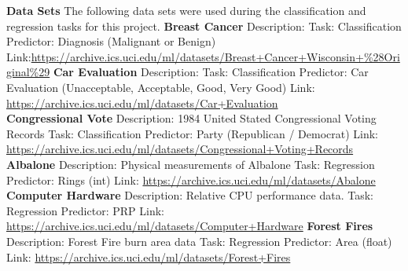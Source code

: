 \documentclass[twoside,11pt]{article}
\begin{document}
{\noindent}{\bf Data Sets}\newline
The following data sets were used during the classification and regression tasks for this project.\newline
{\bf Breast Cancer}\newline
Description: \newline
Task: Classification\newline
Predictor: Diagnosis (Malignant or Benign)\newline
Link:\newline \url{https://archive.ics.uci.edu/ml/datasets/Breast+Cancer+Wisconsin+%28Original%29}\newline
{\noindent}\textbf{Car Evaluation}\newline
Description:\newline
Task: Classification\newline
Predictor: Car Evaluation (Unacceptable, Acceptable, Good, Very Good)\newline
Link: \newline
\url{https://archive.ics.uci.edu/ml/datasets/Car+Evaluation}\\
{\noindent}\textbf{Congressional Vote}\newline
Description: 1984 United Stated Congressional Voting Records\newline
Task: Classification \newline
Predictor: Party (Republican / Democrat) \newline
Link: \newline
\url{https://archive.ics.uci.edu/ml/datasets/Congressional+Voting+Records}\newline
{\noindent}\textbf{Albalone}\newline
Description: Physical measurements of Albalone\newline
Task: Regression\newline
Predictor: Rings (int)\newline
Link: \newline
\url{https://archive.ics.uci.edu/ml/datasets/Abalone}\newline
{\noindent}\textbf{Computer Hardware}\newline
Description: Relative CPU performance data.\newline
Task: Regression\newline
Predictor: PRP\newline
Link: \newline
\url{https://archive.ics.uci.edu/ml/datasets/Computer+Hardware}\newline
{\noindent}\textbf{Forest Fires}\newline
Description: Forest Fire burn area data\newline
Task: Regression\newline
Predictor: Area (float)\newline
Link: \newline
\url{https://archive.ics.uci.edu/ml/datasets/Forest+Fires}\\
	
\end{document}

